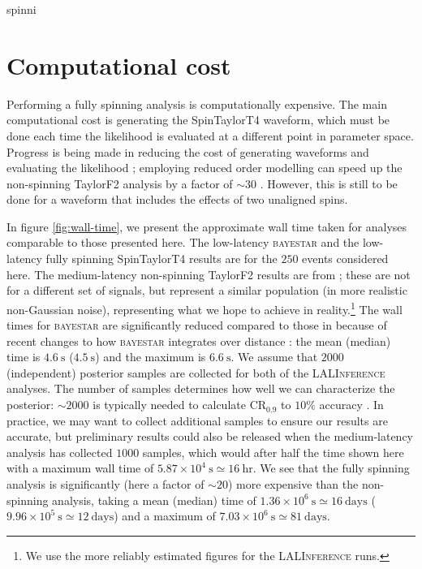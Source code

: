 spinni\appendix

\section{Computational cost}\label{ap:CPU}

Performing a fully spinning analysis is computationally expensive. The main computational cost is generating the SpinTaylorT4 waveform, which must be done each time the likelihood is evaluated at a different point in parameter space. Progress is being made in reducing the cost of generating waveforms and evaluating the likelihood \citep[e.g.,][]{Canizares_2013,P_rrer_2014}; employing reduced order modelling can speed up the non-spinning TaylorF2 analysis by a factor of $\sim 30$ \citep{Canizares_2015}. However, this is still to be done for a waveform that includes the effects of two unaligned spins.

In figure \ref{fig:wall-time}, we present the approximate wall time taken for analyses comparable to those presented here. The low-latency \textsc{bayestar} and the low-latency fully spinning SpinTaylorT4 results are for the $250$ events considered here. The medium-latency non-spinning TaylorF2 results are from \citet{Berry_2014}; these are not for a different set of signals, but represent a similar population (in more realistic non-Gaussian noise), representing what we hope to achieve in reality.\footnote{We use the more reliably estimated figures for the \textsc{LALInference} runs.} The wall times for \textsc{bayestar} are significantly reduced compared to those in \citet{Berry_2014} because of recent changes to how \textsc{bayestar} integrates over distance \citep{SingerPrice2015}: the mean (median) time is $4.6~\mathrm{s}$ ($4.5~\mathrm{s}$) and the maximum is $6.6~\mathrm{s}$.  We assume that $2000$ (independent) posterior samples are collected for both of the \textsc{LALInference} analyses. The number of samples determines how well we can characterize the posterior: $\sim2000$ is typically needed to calculate $\mathrm{CR}_{0.9}$ to $10\%$ accuracy \citep{DelPozzo_2015}. In practice, we may want to collect additional samples to ensure our results are accurate, but preliminary results could also be released when the medium-latency analysis has collected $1000$ samples, which would after half the time shown here with a maximum wall time of $5.87\times10^4~\mathrm{s} \simeq 16~\mathrm{hr}$. We see that the fully spinning analysis is significantly (here a factor of $\sim20$) more expensive than the non-spinning analysis, taking a mean (median) time of $1.36\times10^6~\mathrm{s} \simeq 16~\mathrm{days}$ ($9.96\times10^5~\mathrm{s} \simeq 12~\mathrm{days}$) and a maximum of $7.03\times10^6~\mathrm{s} \simeq 81~\mathrm{days}$.

